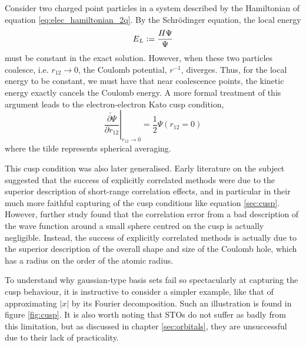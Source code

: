 Consider two charged point particles in a system described by the Hamiltonian of equation \eqref{eq:elec_hamiltonian_2q}. By the Schr\"odinger equation, the local energy
\begin{equation}
    E_L\mathrel{\mathop:}= \frac{H\Psi}{\Psi}
\end{equation}
must be constant in the exact solution. However, when these two particles coalesce, i.e. $r_{12}\to 0$, the Coulomb potential, $r^{-1}$, diverges. Thus, for the local energy to be constant, we must have that near coalescence points, the kinetic energy exactly cancels the Coulomb energy. A more formal treatment of this argument leads to the electron-electron Kato cusp condition,\cite{katoEigenfunctionsManyparticleSystems1957a}
\begin{equation}
    \label{eq:cusp}
    \left.\widetilde{\frac{\partial \Psi}{\partial r_{12}}}\right|_{r_{12}\to 0}
    = \frac 12 \Psi(r_{12}=0)
\end{equation}
where the tilde represents spherical averaging.

This cusp condition was also later generalised.\cite{packCuspConditionsMolecular1966,kurokawaChapterTwoGeneral2016}
Early literature on the subject suggested that the success of explicitly correlated methods were due to the superior description of short-range correlation effects, and in particular in their much more faithful capturing of the cusp conditions like equation \ref{sec:cusp}.\cite{roothaanAnalytical1960,watsonApproximate1960,weissConfiguration1961,schwartzGround1962}
However, further study found that the correlation error from a bad description of the wave function around a small sphere centred on the cusp is actually negligible.\cite{coulsonElectron1961,gilbertInterpretation1963,prendergastImpact2001,klopperR122007} Instead, the success of explicitly correlated methods is actually due to the superior description of the overall shape and size of the Coulomb hole, which has a radius on the order of the atomic radius.

To understand why gaussian-type basis sets fail so spectacularly at capturing the cusp behaviour, it is instructive to consider a simpler example, like that of approximating $|x|$ by its Fourier decomposition. Such an illustration is found in figure \ref{fig:cusp}. It is also worth noting that \glspl{STO} do not suffer as badly from this limitation,\cite{kongExplicitly2012} but as discussed in chapter \ref{sec:orbitals}, they are unsuccessful due to their lack of practicality.


